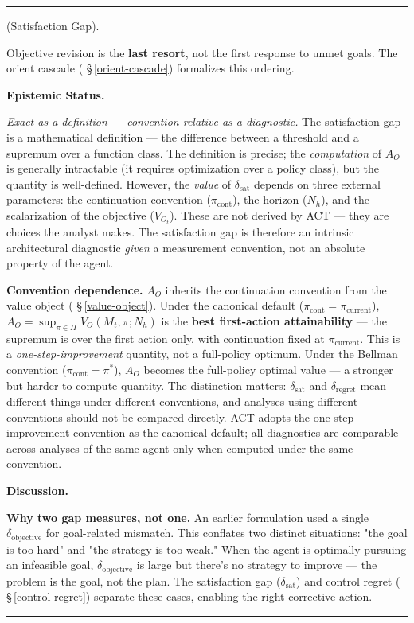 \documentclass[11pt,oneside]{article}
\newcounter{claim}[section]
\renewcommand{\theclaim}{\thesection.\arabic{claim}}
\newenvironment{segment}[2]{%
  \refstepcounter{claim}%
  \bigskip\noindent\hrule\smallskip
  \noindent{\bfseries #1~\theclaim}\enskip(#2).\par\smallskip
  \noindent\ignorespaces
}{%
  \par\smallskip\noindent\hrule\bigskip
}
\newenvironment{definition}[1][]{\begin{segment}{Definition}{#1}}{\end{segment}}
\begin{document}
\begin{definition}[Satisfaction Gap]
Objective revision is the \textbf{last resort}, not the first response to unmet goals. The orient cascade ( \S\,\ref{orient-cascade}) formalizes this ordering.


\medskip\noindent\textbf{Epistemic Status.}


\textit{Exact as a definition — convention-relative as a diagnostic.} The satisfaction gap is a mathematical definition — the difference between a threshold and a supremum over a function class. The definition is precise; the \textit{computation} of $A_O$ is generally intractable (it requires optimization over a policy class), but the quantity is well-defined. However, the \textit{value} of $\delta_{\text{sat}}$ depends on three external parameters: the continuation convention ($\pi_{\text{cont}}$), the horizon ($N_h$), and the scalarization of the objective ($V_{O_t}$). These are not derived by ACT — they are choices the analyst makes. The satisfaction gap is therefore an intrinsic architectural diagnostic \textit{given} a measurement convention, not an absolute property of the agent.

\textbf{Convention dependence.} $A_O$ inherits the continuation convention from the value object ( \S\,\ref{value-object}). Under the canonical default ($\pi_{\text{cont}} = \pi_{\text{current}}$), $A_O = \sup_{\pi \in \Pi} V_O(M_t, \pi; N_h)$ is the \textbf{best first-action attainability} — the supremum is over the first action only, with continuation fixed at $\pi_{\text{current}}$. This is a \textit{one-step-improvement} quantity, not a full-policy optimum. Under the Bellman convention ($\pi_{\text{cont}} = \pi^*$), $A_O$ becomes the full-policy optimal value — a stronger but harder-to-compute quantity. The distinction matters: $\delta_{\text{sat}}$ and $\delta_{\text{regret}}$ mean different things under different conventions, and analyses using different conventions should not be compared directly. ACT adopts the one-step improvement convention as the canonical default; all diagnostics are comparable across analyses of the same agent only when computed under the same convention.


\medskip\noindent\textbf{Discussion.}


\textbf{Why two gap measures, not one.} An earlier formulation used a single $\delta_{\text{objective}}$ for goal-related mismatch. This conflates two distinct situations: "the goal is too hard" and "the strategy is too weak." When the agent is optimally pursuing an infeasible goal, $\delta_{\text{objective}}$ is large but there's no strategy to improve — the problem is the goal, not the plan. The satisfaction gap ($\delta_{\text{sat}}$) and control regret ( \S\,\ref{control-regret}) separate these cases, enabling the right corrective action.


\end{definition}
\end{document}
